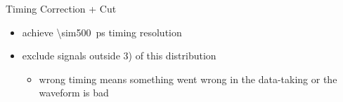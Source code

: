 \begin{frame}{Timing Correction + Cut}

	
	\begin{itemize}\itemfill
		\item achieve \SI{\sim500}{\pico\second} timing resolution
		\item exclude signals outside \SI{3}{\sigma}) of this distribution
		\begin{itemize}
			\item wrong timing means something went wrong in the data-taking or the waveform is bad
		\end{itemize}
	\end{itemize}

\end{frame}
